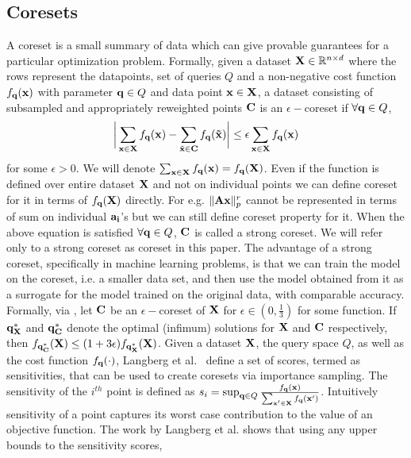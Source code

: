 \subsection{Coresets}
A coreset is a small summary of data which can give provable guarantees for a particular optimization problem. 
Formally, given a dataset
$\mathbf{X} \in \mathbb{R}^{n \times d}$ where the rows represent the datapoints, set of queries $Q$ and a non-negative cost function $\mathnormal{f}_{\mathbf{q}}(\mathbf{x})$ with parameter $\mathbf{q} \in {Q}$ and data point $\mathbf{x} \in \mathbf{X}$, a dataset consisting of subsampled and appropriately reweighted points $\mathbf{C}$ is an $\epsilon-$coreset if $\forall \mathbf{q} \in Q$, 
\begin{equation*}
  \bigg|\sum_{\mathbf{x} \in \mathbf{X}}f_{\mathbf{q}}(\mathbf{x}) - \sum_{\tilde{\mathbf{x}} \in \mathbf{C}}{f}_{\mathbf{q}}(\mathbf{\tilde{x}})\bigg| \leq \epsilon\sum_{\mathbf{x} \in \mathbf{X}}{f}_{\mathbf{q}}(\mathbf{x})  
\end{equation*}
 for some $\epsilon > 0$. We will denote $\sum_{\mathbf{x} \in \mathbf{X}}f_{\mathbf{q}}(\mathbf{x}) = f_\mathbf{q}(\mathbf{X})$. Even if the function is defined over entire dataset $\mathbf{X}$ and not on individual points we can define coreset for it in terms of $f_\mathbf{q}(\mathbf{X})$ directly. For e.g. $\|\mathbf{Ax}\|_p^r$ cannot be represented in terms of sum on individual $\mathbf{a_{i}}$'s but we can still define coreset property for it.
 When the above equation is satisfied  $\forall \mathbf{q} \in Q$, $\mathbf{C}$ is  called a strong coreset. We will refer only to a strong coreset as coreset in this paper. The advantage of
 a strong coreset, specifically in machine learning problems, is that we can train the model on the coreset, i.e. a smaller data set, and then use the model obtained from it as a surrogate for the model trained on the original data, with comparable accuracy. Formally, via \cite{bachem2017practical}, let $\mathbf{C}$ be an $\epsilon-$coreset of $\mathbf{X}$  for $\epsilon \in (0,\frac{1}{3})$ for some function. If $\mathbf{q^{*}_X}$ and $\mathbf{q^{*}_C}$ denote the optimal (infimum) solutions for $\mathbf{X}$ and $\mathbf{C}$ respectively, then $f_{\mathbf{q^{*}_C}}(\mathbf{X}) \leq (1+3\epsilon)f_{\mathbf{q^{*}_X}}(\mathbf{X})$. 
Given a dataset $\mathbf{X}$, the query space $Q$, as well as the cost function $f_{\mathbf{q}}(\cdot)$, Langberg et al.~\cite{langberg2010universal} define a set of scores,
termed as sensitivities, that can be used to create coresets via importance sampling. 
The sensitivity of the  $i^{th}$ point is defined as 
$s_{i} = \sup_{\mathbf{q} \in Q} \frac{f_{\mathbf{q}}(\mathbf{x})}{\sum_{\mathbf{x'} \in \mathbf{X}} {{f}_\mathbf{q}(\mathbf{x'})}}$.
Intuitively sensitivity of a point captures its worst case contribution to the value of an objective function. The work by Langberg et al. \cite{langberg2010universal} shows that using any upper bounds to the sensitivity scores, 
